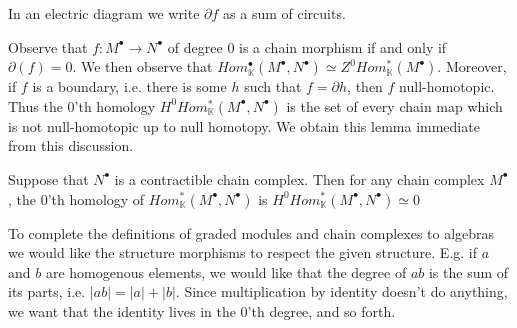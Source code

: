 \documentclass[../thesis.tex]{subfiles}
\begin{document}
            In an electric diagram we write $\partial f$ as a sum of circuits.
            \begin{center}
            \end{center}

            Observe that $f:M^{\bullet}\rightarrow N^{\bullet}$ of degree $0$ is a chain morphism if and only if $\partial(f) = 0$. We then observe that $Hom_{\mathbb{K}}^{\bullet}(M^{\bullet},N^{\bullet})\simeq Z^0Hom_{\mathbb{K}}^*(M^{\bullet})$. Moreover, if $f$ is a boundary, i.e. there is some $h$ such that $f = \partial h$, then $f$ null-homotopic. Thus the $0$'th homology $H^0Hom^*_\mathbb{K}(M^\bullet, N^\bullet)$ is the set of every chain map which is not null-homotopic up to null homotopy. We obtain this lemma immediate from this discussion.

            \begin{lemma}
                Suppose that $N^\bullet$ is a contractible chain complex. Then for any chain complex $M^\bullet$, the $0$'th homology of $Hom^*_\mathbb{K}(M^\bullet, N^\bullet)$ is $H^0Hom^*_\mathbb{K}(M^\bullet, N^\bullet)\simeq 0$
            \end{lemma}

            To complete the definitions of graded modules and chain complexes to algebras we would like the structure morphisms to respect the given structure. E.g. if $a$ and $b$ are homogenous elements, we would like that the degree of $ab$ is the sum of its parts, i.e. $|ab| = |a| + |b|$. Since multiplication by identity doesn't do anything, we want that the identity lives in the $0$'th degree, and so forth.
\end{document}
